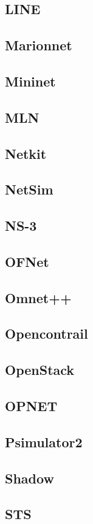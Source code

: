 \subsection{LINE}
\subsection{Marionnet}
\subsection{Mininet} %
\subsection{MLN}
\subsection{Netkit}
\subsection{NetSim}
\subsection{NS-3} %
\subsection{OFNet} %
\subsection{Omnet++}
\subsection{Opencontrail} %
\subsection{OpenStack}
\subsection{OPNET}
\subsection{Psimulator2}
\subsection{Shadow}
\subsection{STS} %
